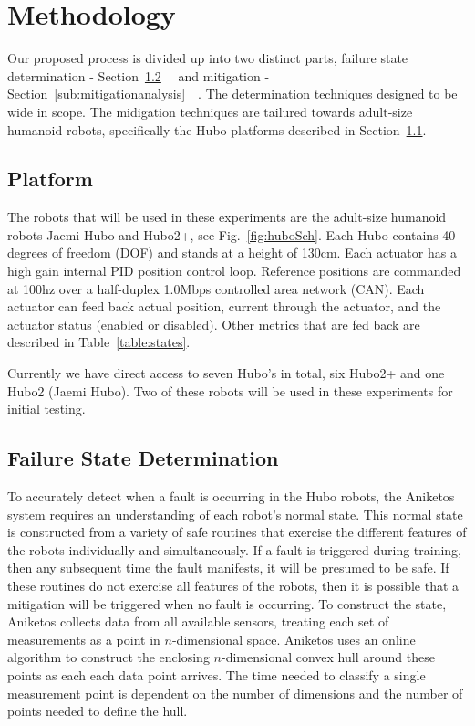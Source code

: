 \section{Methodology}

Our proposed process is divided up into two distinct parts, failure state 
determination - Section~\ref{sub:FailureStateDetermination}~~ and mitigation - Section~\ref{sub:mitigationanalysis}~~.  The determination techniques designed to be 
wide in scope.  The midigation techniques are tailured towards adult-size
humanoid robots, specifically the Hubo platforms described in Section~\ref{sec:platform}.

 
\subsection{Platform}\label{sec:platform}
The robots that will be used in these experiments are the adult-size 
humanoid robots Jaemi Hubo and Hubo2+, see Fig.~\ref{fig:huboSch}.  
Each Hubo contains 40 degrees of freedom (DOF) and stands at a height of 130cm.
Each actuator has a high gain internal PID position control loop.  Reference positions are
commanded at 100hz over a half-duplex 1.0Mbps controlled area network (CAN).
Each actuator can feed back actual position, current through the actuator, and the actuator status 
(enabled or disabled).  Other metrics that are fed back are described in 
Table~\ref{table:states}.  


Currently we have direct access to seven Hubo's in total, six Hubo2+ and one Hubo2 (Jaemi Hubo).
Two of these robots will be used in these experiments for initial testing.



\subsection{Failure State Determination}
\label{sub:FailureStateDetermination}
To accurately detect when a fault is occurring in the Hubo robots, the Aniketos system requires an understanding of each robot's normal state. This normal state is constructed from a variety of safe routines that exercise the different features of the robots individually and simultaneously. If a fault is triggered during training, then any subsequent time the fault manifests, it will be presumed to be safe. If these routines do not exercise all features of the robots, then it is possible that a mitigation will be triggered when no fault is occurring. To construct the state, Aniketos collects data from all available sensors, treating each set of measurements as a point in $n$-dimensional space. Aniketos uses an online algorithm to construct the enclosing $n$-dimensional convex hull around these points as each each data point arrives. The time needed to classify a single measurement point is dependent on the number of dimensions and the number of points needed to define the hull.


